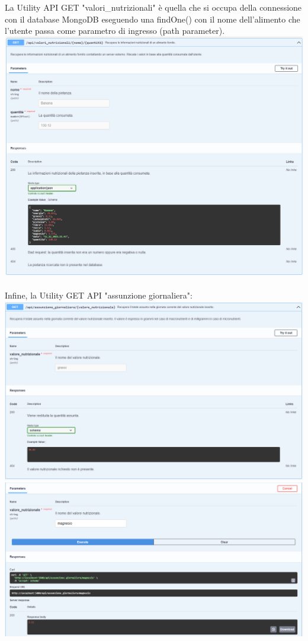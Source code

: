 \documentclass{article}
\begin{document}
   La Utility API GET "valori\_nutrizionali" è quella che si occupa della connessione con il database MongoDB eseguendo una findOne() con il nome dell'alimento che l'utente passa come parametro di ingresso (path parameter).\\
   \includegraphics[scale=0.5]{doc get valori_nutrizionali.png}\\
   \\
   Infine, la Utility GET API "assunzione giornaliera":\\
   \includegraphics[scale=0.5]{doc get assunzione_giornaliera.png}\\
   \includegraphics[scale=0.5]{risposta get assunzione_giornaliera.png}\\
\end{document}
